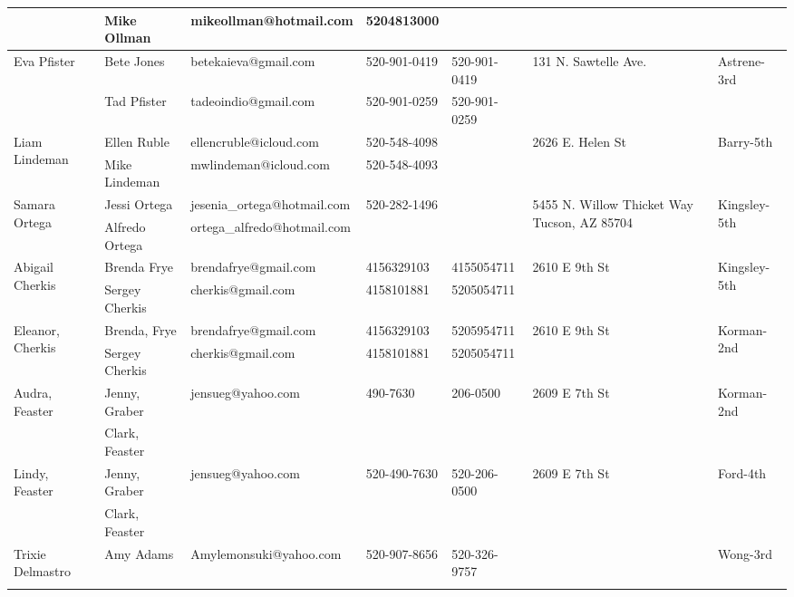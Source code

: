 \documentclass[landscape]{book}\usepackage[]{graphicx}\usepackage[]{color}
\begin{document}
\begin{longtable}{p{70pt}|p{75pt}|p{120pt}|p{60pt}|p{60pt}|p{100pt}|p{70pt}|}
 & Mike Ollman & mikeollman@hotmail.com & 5204813000 &  & & \\
\hline
\multirow{2}{70pt}{Eva Pfister} & Bete Jones & betekaieva@gmail.com & 520-901-0419 & 520-901-0419 & \multirow{2}{100pt}{131 N. Sawtelle Ave.} & \multirow{2}{70pt}{Astrene-3rd}\\
 & Tad Pfister & tadeoindio@gmail.com & 520-901-0259 & 520-901-0259 & & \\
\hline
\multirow{2}{70pt}{Liam Lindeman} & Ellen Ruble & ellencruble@icloud.com & 520-548-4098 &  & \multirow{2}{100pt}{2626 E. Helen St} & \multirow{2}{70pt}{Barry-5th}\\
 & Mike Lindeman & mwlindeman@icloud.com & 520-548-4093 &  & & \\
\hline
\multirow{2}{70pt}{Samara Ortega} & Jessi Ortega & jesenia\_ortega@hotmail.com & 520-282-1496 &  & \multirow{2}{100pt}{5455 N. Willow Thicket Way Tucson, AZ 85704} & \multirow{2}{70pt}{Kingsley-5th}\\
 & Alfredo Ortega & ortega\_alfredo@hotmail.com &  &  & & \\
\hline
\multirow{2}{70pt}{Abigail Cherkis} & Brenda Frye & brendafrye@gmail.com & 4156329103 & 4155054711 & \multirow{2}{100pt}{2610 E 9th St} & \multirow{2}{70pt}{Kingsley-5th}\\
 & Sergey Cherkis & cherkis@gmail.com & 4158101881 & 5205054711 & & \\
\hline
\multirow{2}{70pt}{Eleanor, Cherkis} & Brenda, Frye & brendafrye@gmail.com & 4156329103 & 5205954711 & \multirow{2}{100pt}{2610 E 9th St} & \multirow{2}{70pt}{Korman-2nd}\\
 & Sergey Cherkis & cherkis@gmail.com & 4158101881 & 5205054711 & & \\
\hline
\multirow{2}{70pt}{Audra, Feaster} & Jenny, Graber & jensueg@yahoo.com & 490-7630 & 206-0500 & \multirow{2}{100pt}{2609 E 7th St} & \multirow{2}{70pt}{Korman-2nd}\\
 & Clark, Feaster &  &  &  & & \\
\hline
\multirow{2}{70pt}{Lindy, Feaster} & Jenny, Graber & jensueg@yahoo.com & 520-490-7630 & 520-206-0500 & \multirow{2}{100pt}{2609 E 7th St} & \multirow{2}{70pt}{Ford-4th}\\
 & Clark, Feaster &  &  &  & & \\
\hline
\multirow{2}{70pt}{Trixie Delmastro } & Amy Adams & Amylemonsuki@yahoo.com & 520-907-8656 & 520-326-9757 & \multirow{2}{100pt}{} & \multirow{2}{70pt}{Wong-3rd}\\
 &  &  &  &  & & \\

\end{longtable}
\end{document}
